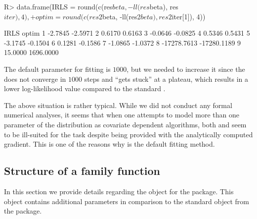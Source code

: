 \documentclass[
]{jss}
\newcommand{\1}{\mathcal{I}} \newcommand{\bZero}{\boldsymbol{0}}
\begin{document}
\begin{CodeChunk}
\end{CodeChunk}

\begin{CodeChunk}
\begin{CodeInput}
R> data.frame(IRLS  = round(c(res$beta, -ll(res$beta), res$iter), 4),
+            optim = round(c(res2$beta, -ll(res2$beta), res2$iter[1]), 4))
\end{CodeInput}
\begin{CodeOutput}
         IRLS       optim
1     -2.7845     -2.5971
2      0.6170      0.6163
3     -0.0646     -0.0825
4      0.5346      0.5431
5     -3.1745     -0.1504
6      0.1281     -0.1586
7     -1.0865     -1.0372
8 -17278.7613 -17280.1189
9     15.0000   1696.0000
\end{CodeOutput}
\end{CodeChunk}

The default  parameter for  fitting is
\(1000\), but we needed to increase it since the  does not
converge in \(1000\) steps and ``gets stuck'' at a plateau, which
results in a lower log-likelihood value compared to the standard
.

The above situation is rather typical. While we did not conduct any
formal numerical analyses, it seems that when one attempts to model more
than one parameter of the distribution as covariate dependent
 algorithms, both  and 
seem to be ill-suited for the task despite being provided with the
analytically computed gradient. This is one of the reasons why
 is the default fitting method.

\clearpage

\subsection{Structure of a family function}\label{sec-family}

In this section we provide details regarding the  object
for the  package. This object contains additional
parameters in comparison to the standard  object from the
 package.
\end{document}
